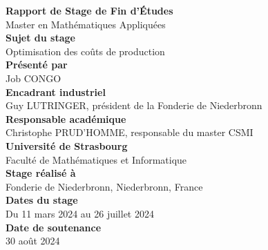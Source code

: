 \documentclass[12pt]{article}
\begin{document}
\begin{titlepage}
    \centering
    
    {\Huge \textbf{Rapport de Stage de Fin d'Études}} \\[1.5cm]
    {\LARGE Master en Mathématiques Appliquées} \\[1cm]
    {\Large \textbf{Sujet du stage }} \\
    {\Large Optimisation des coûts de production} \\[0.5cm]

    {\large \textbf{Présenté par }} \\
    {\large Job CONGO} \\[0.5cm]
    
    {\large \textbf{Encadrant industriel }} \\
    {\large Guy LUTRINGER, président de la Fonderie de Niederbronn} \\[0.5cm]
    

    {\large \textbf{Responsable académique }} \\
    {\large Christophe PRUD’HOMME, responsable du master CSMI} \\[0.5cm]
  
    {\large \textbf{Université de Strasbourg}} \\
    {\large Faculté de Mathématiques et Informatique} \\[0.5cm]

    {\large \textbf{Stage réalisé à }} \\
    {\large Fonderie de Niederbronn, Niederbronn, France} \\[0.5cm]

    {\large \textbf{Dates du stage }} \\
    {\large Du 11 mars 2024 au 26 juillet 2024} \\[0.5cm]


    {\large \textbf{Date de soutenance }} \\
    {\large 30 août 2024} 
    

\end{titlepage}
\end{document}
